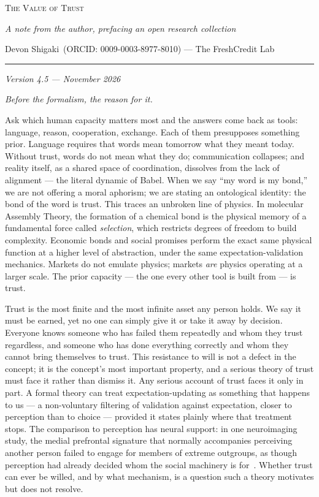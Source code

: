 \documentclass[11pt]{article}
\renewcommand{\maketitle}{%
  \begin{center}
    {\LARGE\scshape The Value of Trust\par}
    \vspace{0.9em}
    {\normalsize\itshape A note from the author, prefacing an open research collection\par}
    \vspace{1.1em}
    {\normalsize Devon Shigaki~(ORCID: 0009-0003-8977-8010) --- The FreshCredit Lab\par}
    \vspace{0.8em}
    {\rule{0.32\textwidth}{0.4pt}\par}
  \end{center}
  \vspace{1.2em}
}
\begin{document}
\maketitle
\begin{center}\small\itshape Version 4.5 --- November 2026\end{center}
\thispagestyle{empty}

\noindent\emph{Before the formalism, the reason for it.}

Ask which human capacity matters most and the answers come back as tools: language, reason, cooperation, exchange. Each of them presupposes something prior. Language requires that words mean tomorrow what they meant today. Without trust, words do not mean what they do; communication collapses; and reality itself, as a shared space of coordination, dissolves from the lack of alignment --- the literal dynamic of Babel. When we say ``my word is my bond,'' we are not offering a moral aphorism; we are stating an ontological identity: the bond of the word is trust. This traces an unbroken line of physics. In molecular Assembly Theory, the formation of a chemical bond is the physical memory of a fundamental force called \emph{selection}, which restricts degrees of freedom to build complexity. Economic bonds and social promises perform the exact same physical function at a higher level of abstraction, under the same expectation-validation mechanics. Markets do not emulate physics; markets \emph{are} physics operating at a larger scale. The prior capacity --- the one every other tool is built from --- is trust.

Trust is the most finite and the most infinite asset any person holds. We say it must be earned, yet no one can simply give it or take it away by decision. Everyone knows someone who has failed them repeatedly and whom they trust regardless, and someone who has done everything correctly and whom they cannot bring themselves to trust. This resistance to will is not a defect in the concept; it is the concept's most important property, and a serious theory of trust must face it rather than dismiss it. Any serious account of trust faces it only in part. A formal theory can treat expectation-updating as something that happens to us --- a non-voluntary filtering of validation against expectation, closer to perception than to choice --- provided it states plainly where that treatment stops. The comparison to perception has neural support: in one neuroimaging study, the medial prefrontal signature that normally accompanies perceiving another person failed to engage for members of extreme outgroups, as though perception had already decided whom the social machinery is for~\cite{harris2006}. Whether trust can ever be willed, and by what mechanism, is a question such a theory motivates but does not resolve.
\end{document}

